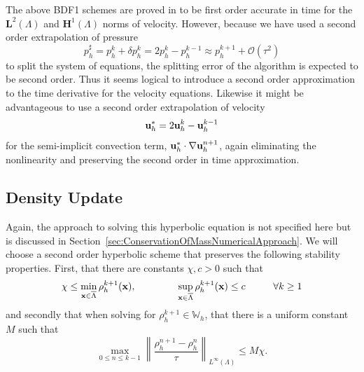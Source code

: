 \documentclass[letterpaper]{erdc}
\begin{document}
The above BDF1 schemes are proved in \cite{guermond2011error} to be first order
accurate in time for the $\mathbf{L}^2(\Lambda)$ and $\mathbf{H}^1(\Lambda)$
norms of velocity.  However, because we have used a second order extrapolation
of pressure
\begin{equation}
  p^{\sharp}_h = p_h^{k} + \delta p_h^{k} = 2p^{k}_h-p^{k-1}_h \approx p_h^{k+1} + \mathcal{O}\left(\tau^2 \right)
\end{equation}
to split the system of equations, the splitting error of the algorithm is
expected to be second order.  Thus it seems logical to introduce a second order
approximation to the time derivative for the velocity equations.  Likewise it
might be advantageous to use a second order extrapolation of velocity
\begin{equation}
  \textbf{u}^{*}_h = 2\textbf{u}_h^{k}  - \textbf{u}_h^{k-1}
\end{equation}
for the semi-implicit convection term, $\textbf{u}_h^{*}\cdot\nabla\textbf{u}_h^{n+1}$, again
eliminating the nonlinearity and preserving the second order in time
approximation.


%
%
\subsection{Density Update}
Again, the approach to solving this hyperbolic equation is not specified here
but is discussed in Section~\ref{sec:ConservationOfMassNumericalApproach}.  We
will choose a second order hyperbolic scheme that preserves the following
stability properties.  First, that there are constants $\chi, c > 0$ such that
\begin{equation}
  \chi \leq \displaystyle\min_{\textbf{x}\in\overline{\Lambda}} \rho_h^{k+1}(\textbf{x}),  \hspace{1.5cm} \displaystyle\sup_{\textbf{x}\in\overline{\Lambda}}\rho_h^{k+1}(\textbf{x}) \leq c \hspace{1cm} \forall k\geq 1
\end{equation}
and secondly that when solving for $\rho_h^{k+1}\in \mathbb{W}_h$, that there
is a uniform constant $M$ such that
\begin{equation}
  \displaystyle\max_{0\leq n\leq k-1} \left \| \frac{\rho_h^{n+1} - \rho_h^{n}}{\tau}\right\|_{L^{\infty}(\Lambda)} \leq M\chi.
\end{equation}

%
%
\end{document}
